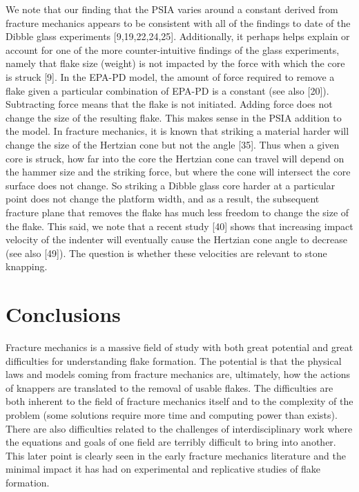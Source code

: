 \documentclass[10pt,letterpaper]{article}
\begin{document}
We note that our finding that the PSIA varies around a constant derived
from fracture mechanics appears to be consistent with all of the
findings to date of the Dibble glass experiments {[}9,19,22,24,25{]}.
Additionally, it perhaps helps explain or account for one of the more
counter-intuitive findings of the glass experiments, namely that flake
size (weight) is not impacted by the force with which the core is struck
{[}9{]}. In the EPA-PD model, the amount of force required to remove a
flake given a particular combination of EPA-PD is a constant (see also
{[}20{]}). Subtracting force means that the flake is not initiated.
Adding force does not change the size of the resulting flake. This makes
sense in the PSIA addition to the model. In fracture mechanics, it is
known that striking a material harder will change the size of the
Hertzian cone but not the angle {[}35{]}. Thus when a given core is
struck, how far into the core the Hertzian cone can travel will depend
on the hammer size and the striking force, but where the cone will
intersect the core surface does not change. So striking a Dibble glass
core harder at a particular point does not change the platform width,
and as a result, the subsequent fracture plane that removes the flake
has much less freedom to change the size of the flake. This said, we
note that a recent study {[}40{]} shows that increasing impact velocity
of the indenter will eventually cause the Hertzian cone angle to
decrease (see also {[}49{]}). The question is whether these velocities
are relevant to stone knapping.

\hypertarget{conclusions}{%
\section{Conclusions}\label{conclusions}}

Fracture mechanics is a massive field of study with both great potential
and great difficulties for understanding flake formation. The potential
is that the physical laws and models coming from fracture mechanics are,
ultimately, how the actions of knappers are translated to the removal of
usable flakes. The difficulties are both inherent to the field of
fracture mechanics itself and to the complexity of the problem (some
solutions require more time and computing power than exists). There are
also difficulties related to the challenges of interdisciplinary work
where the equations and goals of one field are terribly difficult to
bring into another. This later point is clearly seen in the early
fracture mechanics literature and the minimal impact it has had on
experimental and replicative studies of flake formation.
\end{document}

